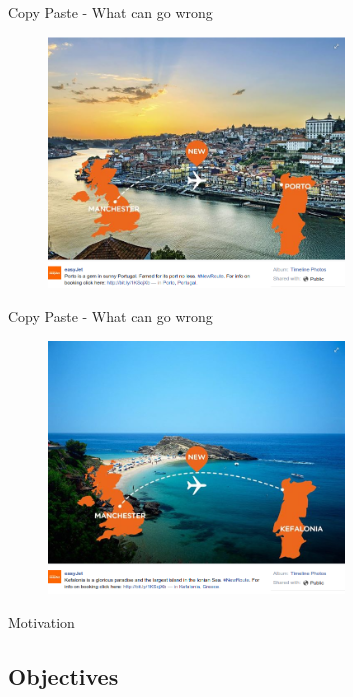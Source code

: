 \documentclass[xcolor=dvipsnames, 14pt]{beamer}
\begin{document}
\begin{frame}{Copy Paste - What can go wrong}
\begin{figure}[htbp]
  \centering
  \includegraphics[width=0.7\textwidth]{img/WhatCanGoWrongWithCopyPaste1.png}
  \label{fig:CopyPaste}
\end{figure}
\end{frame}
\begin{frame}{Copy Paste - What can go wrong}
\begin{figure}[htbp]
  \centering
  \includegraphics[width=0.7\textwidth]{img/WhatCanGoWrongWithCopyPaste.png}
  \label{fig:CopyPaste-error}
\end{figure}
\end{frame}
\begin{frame}{Motivation}

\end{frame}
\subsection{Objectives}
\end{document}
